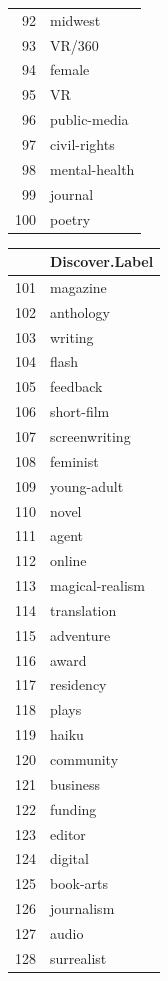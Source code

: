 \documentclass[]{report}   %
\begin{document}
\begin{figure}
\begin{minipage}[t]{0.24\textwidth}
\begin{tabular}{rl}
  92 & midwest \\ 
  93 & VR/360 \\ 
  94 & female \\ 
  95 & VR \\ 
  96 & public-media \\ 
  97 & civil-rights \\ 
  98 & mental-health \\ 
  99 & journal \\ 
  100 & poetry \\ 
  \hline
\end{tabular}
    \end{minipage}
\begin{minipage}[t]{0.24\textwidth}

\begin{tabular}{rl}
  \hline
 & Discover.Label \\ 
  \hline
  101 & magazine \\ 
  102 & anthology \\ 
  103 & writing \\ 
  104 & flash \\ 
  105 & feedback \\ 
  106 & short-film \\ 
  107 & screenwriting \\ 
  108 & feminist \\ 
  109 & young-adult \\ 
  110 & novel \\ 
  111 & agent \\ 
  112 & online \\ 
  113 & magical-realism \\ 
  114 & translation \\ 
  115 & adventure \\ 
  116 & award \\ 
  117 & residency \\ 
  118 & plays \\ 
  119 & haiku \\ 
  120 & community \\ 
  121 & business \\ 
  122 & funding \\ 
  123 & editor \\ 
  124 & digital \\ 
  125 & book-arts \\ 
  126 & journalism \\ 
  127 & audio \\ 
  128 & surrealist \\ 

\end{tabular}
\end{minipage}
\end{figure}
\end{document}
